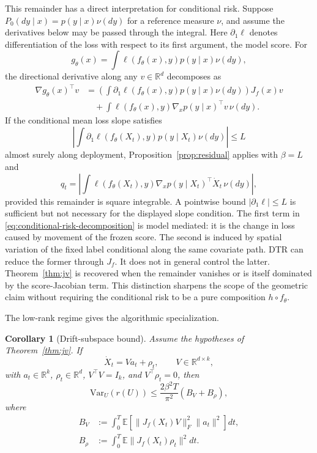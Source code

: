 \documentclass[conference]{IEEEtran}
\newtheorem{corollary}{Corollary}
\newcommand{\E}{\mathbb{E}}
\newcommand{\Var}{\mathrm{Var}}
\newcommand{\R}{\mathbb{R}}
\begin{document}
This remainder has a direct interpretation for conditional risk. Suppose $P_0(dy\mid x)=p(y\mid x)\nu(dy)$ for a reference measure $\nu$, and assume the derivatives below may be passed through the integral. Here $\partial_1\ell$ denotes differentiation of the loss with respect to its first argument, the model score. For
\[
g_\theta(x)=\int \ell(f_\theta(x),y)p(y\mid x)\nu(dy),
\]
the directional derivative along any $v\in\R^d$ decomposes as
\begin{align}
\nabla g_\theta(x)^\top v
&=
\left(\int \partial_1\ell(f_\theta(x),y)p(y\mid x)\nu(dy)\right)J_f(x)v
\nonumber\\
&\quad+
\int \ell(f_\theta(x),y)\nabla_xp(y\mid x)^\top v\,\nu(dy).
\label{eq:conditional-risk-decomposition}
\end{align}
If the conditional mean loss slope satisfies
\[
\left|
\int \partial_1\ell(f_\theta(X_t),y)
p(y\mid X_t)\nu(dy)
\right|\le L
\]
almost surely along deployment, Proposition~\ref{prop:residual} applies with $\beta=L$ and
\begin{equation}
\label{eq:conditional-remainder}
q_t=
\left|
\int \ell(f_\theta(X_t),y)
\nabla_xp(y\mid X_t)^\top\dot X_t\,\nu(dy)
\right|,
\end{equation}
provided this remainder is square integrable. A pointwise bound $|\partial_1\ell|\le L$ is sufficient but not necessary for the displayed slope condition. The first term in \eqref{eq:conditional-risk-decomposition} is model mediated: it is the change in loss caused by movement of the frozen score. The second is induced by spatial variation of the fixed label conditional along the same covariate path. DTR can reduce the former through $J_f$. It does not in general control the latter. Theorem~\ref{thm:jv} is recovered when the remainder vanishes or is itself dominated by the score-Jacobian term. This distinction sharpens the scope of the geometric claim without requiring the conditional risk to be a pure composition $h\circ f_\theta$.

The low-rank regime gives the algorithmic specialization.

\begin{corollary}[Drift-subspace bound]
\label{cor:lowrank}
Assume the hypotheses of Theorem~\ref{thm:jv}. If
\[
\dot X_t = Va_t + \rho_t,
\qquad
V\in\R^{d\times k},
\]
with $a_t\in\R^k$, $\rho_t\in\R^d$, $V^\top V=I_k$, and $V^\top \rho_t=0$, then
\begin{equation}
\label{eq:lowrank-bound}
\Var_U(r(U))
\le
\frac{2\beta^2 T}{\pi^2}(B_V+B_\rho),
\end{equation}
where
\begin{align*}
B_V &:= \int_0^T \E[\|J_f(X_t)V\|_F^2\|a_t\|^2]dt, \\
B_\rho &:= \int_0^T \E\|J_f(X_t)\rho_t\|^2dt.
\end{align*}
\end{corollary}
\end{document}
